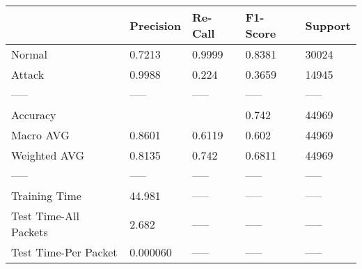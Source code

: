 \begin{tabular}{lllll}
\toprule
{} & Precision & Re-Call & F1-Score & Support \\
\midrule
Normal                &    0.7213 &  0.9999 &   0.8381 &   30024 \\
Attack                &    0.9988 &   0.224 &   0.3659 &   14945 \\
-----                 &     ----- &   ----- &    ----- &   ----- \\
Accuracy              &           &         &    0.742 &   44969 \\
Macro AVG             &    0.8601 &  0.6119 &    0.602 &   44969 \\
Weighted AVG          &    0.8135 &   0.742 &   0.6811 &   44969 \\
-----                 &     ----- &   ----- &    ----- &   ----- \\
Training Time         &    44.981 &   ----- &    ----- &   ----- \\
Test Time-All Packets &     2.682 &   ----- &    ----- &   ----- \\
Test Time-Per Packet  &  0.000060 &   ----- &    ----- &   ----- \\
\bottomrule
\end{tabular}
